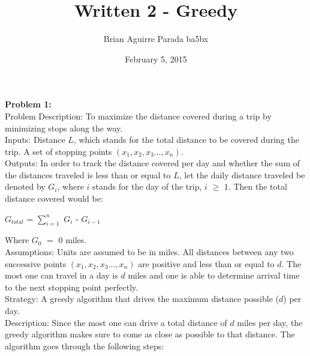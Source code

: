 \documentclass{article}
\title{Written 2 - Greedy}
\author{Brian Aguirre Parada ba5bx}
\date{February 5, 2015}
\begin{document}
\maketitle
\textbf{Problem 1:}\\
Problem Description: To maximize the distance covered during a trip by minimizing stops along the way.\\
Inputs: Distance \(L\), which stands for the total distance to be covered during the trip. A set of stopping points \((x_1,x_2,x_3...,x_n)\).\\ 
Outputs: In order to track the distance covered per day and whether the sum of the distances traveled is less than or equal to \(L\), let the daily distance traveled be denoted by \(G_i\), where \(i\) stands for the day of the trip, \(i\) $\geq$ \(1\). Then the total distance covered would be:
\begin{center}
 \(G_{total}\) = $\sum\limits_{i=1}^n$ \(G_i\) - \(G_{i-1}\)
\end{center}
Where \(G_0\) $=$ $0$ miles.\\
Assumptions: Units are assumed to be in miles. All distances between any two successive points \((x_1,x_2,x_3...,x_n)\) are positive and less than or equal to \(d\). The most one can travel in a day is \(d\) miles and one is able to determine arrival time to the next stopping point perfectly. \\
Strategy: A greedy algorithm that drives the maximum distance possible (\(d\)) per day.\\
Description: Since the most one can drive a total distance of \(d\) miles per day, the greedy algorithm makes sure to come as close as possible to that distance. The algorithm goes through the following steps:\\
\end{document}
